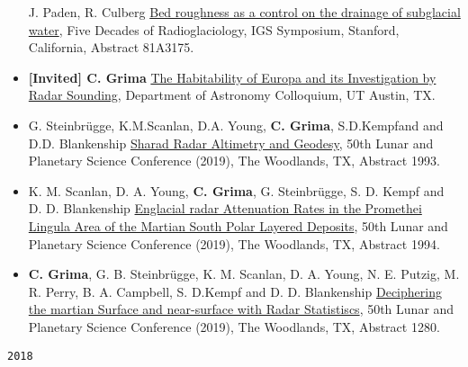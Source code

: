 \begin{itemize}
  J. Paden, R. Culberg
  \href{https://www.igsoc.org/symposia/2019/stanford/proceedings/programmepure.html\#Prog3175}{Bed
  roughness as a control on the drainage of subglacial water}, Five
  Decades of Radioglaciology, IGS Symposium, Stanford, California,
  Abstract 81A3175.
\item
  \textbf{{[}Invited{]} C. Grima}
  \href{https://astronomy.utexas.edu/calendar/icalrepeat.detail/2019/05/07/1040/-/cyril-grima-ut-institute-for-geophysics?filter_reset=1\#abstract}{The
  Habitability of Europa and its Investigation by Radar Sounding},
  Department of Astronomy Colloquium, UT Austin, TX.
\item
  G. Steinbrügge, K.M.Scanlan, D.A. Young, \textbf{C. Grima},
  S.D.Kempfand and D.D. Blankenship
  \href{https://www.hou.usra.edu/meetings/lpsc2019/pdf/1993.pdf}{Sharad
  Radar Altimetry and Geodesy}, 50th Lunar and Planetary Science
  Conference (2019), The Woodlands, TX, Abstract 1993.
\item
  K. M. Scanlan, D. A. Young, \textbf{C. Grima}, G. Steinbrügge, S. D.
  Kempf and D. D. Blankenship
  \href{https://www.hou.usra.edu/meetings/lpsc2019/pdf/1994.pdf}{Englacial
  radar Attenuation Rates in the Promethei Lingula Area of the Martian
  South Polar Layered Deposits}, 50th Lunar and Planetary Science
  Conference (2019), The Woodlands, TX, Abstract 1994.
\item
  \textbf{C. Grima}, G. B. Steinbrügge, K. M. Scanlan, D. A. Young, N.
  E. Putzig, M. R. Perry, B. A. Campbell, S. D.Kempf and D. D.
  Blankenship
  \href{https://www.hou.usra.edu/meetings/lpsc2019/pdf/1280.pdf}{Deciphering
  the martian Surface and near-surface with Radar Statistiscs}, 50th
  Lunar and Planetary Science Conference (2019), The Woodlands, TX,
  Abstract 1280.
\end{itemize}

\noindent\texttt{2018}

